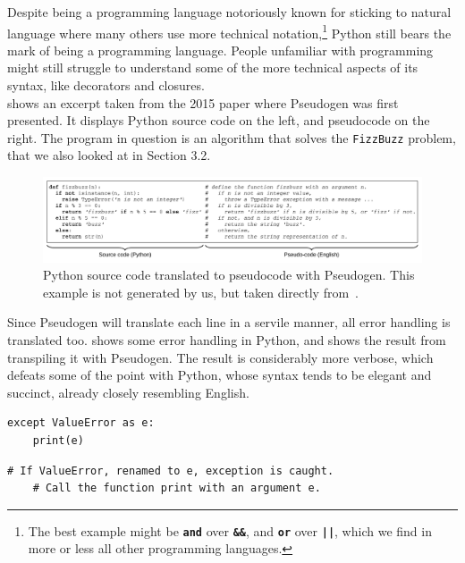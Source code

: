Despite being a programming language notoriously known for sticking to natural language where many others use more technical notation,\footnote{The best example might be \textbf{\texttt{and}} over \textbf{\texttt{\&\&}}, and \textbf{\texttt{or}} over \textbf{\texttt{||}}, which we find in more or less all other programming languages.} Python still bears the mark of being a programming language. People unfamiliar with programming might still struggle to understand some of the more technical aspects of its syntax, like decorators and closures. \\

 shows an excerpt taken from the 2015 paper where Pseudogen was first presented. It displays Python source code on the left, and pseudocode on the right. The program in question is an algorithm that solves the \texttt{FizzBuzz} problem, that we also looked at in Section 3.2. \\

\begin{figure}[ht]
    \centering
    \includegraphics[scale=0.52]{assets/odaetal.png}
    \caption{Python source code translated to pseudocode with Pseudogen. This example is not generated by us, but taken directly from~\cite{pseudogen}.}
    \label{pseudogenExample1}
\end{figure}

Since Pseudogen will translate each line in a servile manner, all error handling is translated too.  shows some error handling in Python, and  shows the result from transpiling it with Pseudogen. The result is considerably more verbose, which defeats some of the point with Python, whose syntax tends to be elegant and succinct, already closely resembling English. \\

\begin{lstlisting}[caption={Error handling in Python.}, captionpos=b, label={Error handling in Python.}]
except ValueError as e:
    print(e)
\end{lstlisting}

\begin{lstlisting}[caption={Pseudocode version of \Cref{Error handling in Python.} generated with Pseudogen. This example is not generated by us, but copied from a video on their website.}, captionpos=b, label={Error handling in Pseudogen.}]
# If ValueError, renamed to e, exception is caught.
    # Call the function print with an argument e.
\end{lstlisting}

